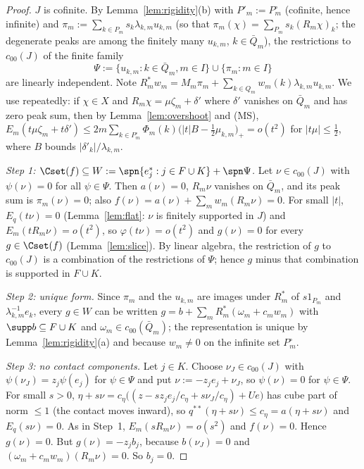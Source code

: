 \begin{proof}
$J$ is cofinite.  By Lemma~\ref{lem:rigidity}(b) with $P'_m:=P^\circ_m$
(cofinite, hence infinite) and $\pi_m:=\sum_{k\in P_m}s_k\lambda_{k,m}
u_{k,m}$ (so that $\pi_m(\chi)=\sum_{P_m}s_k(R_m\chi)_k$; the degenerate
peaks are among the finitely many $u_{k,m}$, $k\in\bar Q_m$), the
restrictions to $c_{00}(J)$ of the finite family
\[
 \Psi:=\{u_{k,m}:k\in\bar Q_m,m\in I\}\cup\{\pi_m:m\in I\}
\]
are linearly independent.  Note $R_m^*w_m=M_m\pi_m+\sum_{k\in
Q_m}w_m(k)\lambda_{k,m}u_{k,m}$.  We use repeatedly: if $\chi\in X$ and
$R_m\chi=\mu\zeta_m+\delta'$ where $\delta'$ vanishes on $\bar Q_m$ and
has zero peak sum, then by Lemma~\ref{lem:overshoot} and \textup{(MS)},
$E_m(t\mu\zeta_m+t\delta')\le2m\sum_{k\in P^\circ_m}\Phi_m(k)\big(|t|B-
\tfrac12\mu_{k,m}\big)_+=o(t^2)$ for $|t\mu|\le\frac12$, where $B$ bounds
$|\delta'_k|/\lambda_{k,m}$.

\emph{Step 1: $\Cset(f)\subseteq W:=\spn\{e_j^*:j\in F\cup K\}+\spn\Psi$.}
Let $\nu\in c_{00}(J)$ with $\psi(\nu)=0$ for all $\psi\in\Psi$.  Then
$a(\nu)=0$, $R_m\nu$ vanishes on $\bar Q_m$, and its peak sum is
$\pi_m(\nu)=0$; also $f(\nu)=a(\nu)+\sum_mw_m(R_m\nu)=0$.  For small $|t|$,
$E_q(t\nu)=0$ (Lemma~\ref{lem:flat}: $\nu$ is finitely supported in $J$) and
$E_m(tR_m\nu)=o(t^2)$, so $\varphi(t\nu)=o(t^2)$ and $g(\nu)=0$ for every
$g\in\Cset(f)$ (Lemma~\ref{lem:slice}).  By linear algebra, the restriction
of $g$ to $c_{00}(J)$ is a combination of the restrictions of $\Psi$; hence
$g$ minus that combination is supported in $F\cup K$.

\emph{Step 2: unique form.}  Since $\pi_m$ and the $u_{k,m}$ are images
under $R_m^*$ of $s1_{P_m}$ and $\lambda_{k,m}^{-1}e_k$, every $g\in W$ can
be written $g=b+\sum_mR_m^*(\omega_m+c_mw_m)$ with $\supp b\subseteq F\cup
K$ and $\omega_m\in c_{00}(\bar Q_m)$; the representation is unique by
Lemma~\ref{lem:rigidity}(a) and because $w_m\ne0$ on the infinite set
$P_m^\circ$.

\emph{Step 3: no contact components.}  Let $j\in K$.  Choose
$\nu_J\in c_{00}(J)$ with $\psi(\nu_J)=z_j\psi(e_j)$ for $\psi\in\Psi$ and
put $\nu:=-z_je_j+\nu_J$, so $\psi(\nu)=0$ for $\psi\in\Psi$.  For small
$s>0$, $\eta+s\nu=c_\eta\big((z-sz_je_j/c_\eta+s\nu_J/c_\eta)+Ue\big)$ has
cube part of norm $\le1$ (the contact moves inward), so
$q^{**}(\eta+s\nu)\le c_\eta=a(\eta+s\nu)$ and $E_q(s\nu)=0$.  As in
Step~1, $E_m(sR_m\nu)=o(s^2)$ and $f(\nu)=0$.  Hence $g(\nu)=0$.  But
$g(\nu)=-z_jb_j$, because $b(\nu_J)=0$ and
$(\omega_m+c_mw_m)(R_m\nu)=0$.  So $b_j=0$.


\end{proof}
